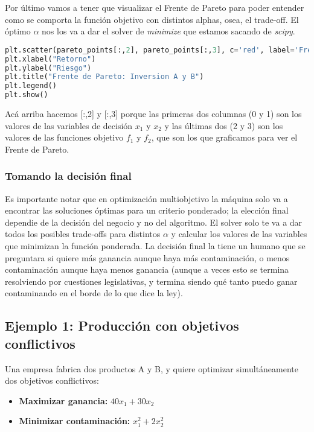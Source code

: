\documentclass[12pt]{article}
\begin{document}
Por último vamos a tener que visualizar el Frente de Pareto para poder entender como se comporta la función objetivo con distintos alphas, osea, el trade-off. El óptimo $\alpha$ nos los va a dar el solver de \textit{minimize} que estamos sacando de \textit{scipy}.

\begin{lstlisting}[language=Python]
plt.scatter(pareto_points[:,2], pareto_points[:,3], c='red', label='Frente de Pareto')
plt.xlabel("Retorno")
plt.ylabel("Riesgo")
plt.title("Frente de Pareto: Inversion A y B")
plt.legend()
plt.show()
\end{lstlisting}

Acá arriba hacemos [:,2] y [:,3] porque las primeras dos columnas (0 y 1) son los valores de las variables de decisión $x_1$ y $x_2$ y las últimas dos (2 y 3) son los valores de las funciones objetivo $f_1$ y $f_2$, que son los que graficamos para ver el Frente de Pareto.

\subsubsection{Tomando la decisión final}

Es importante notar que en optimización multiobjetivo la máquina solo va a encontrar las soluciones óptimas para un criterio ponderado; la elección final dependie de la decisión del negocio y no del algoritmo. El solver solo te va a dar todos los posibles trade-offs para distintos $\alpha$ y calcular los valores de las variables que minimizan la función ponderada. La decisión final la tiene un humano que se preguntara si quiere más ganancia aunque haya más contaminación, o menos contaminación aunque haya menos ganancia (aunque a veces esto se termina resolviendo por cuestiones legislativas, y termina siendo qué tanto puedo ganar contaminando en el borde de lo que dice la ley).

\subsection{Ejemplo 1: Producción con objetivos conflictivos}

Una empresa fabrica dos productos A y B, y quiere optimizar simultáneamente dos objetivos conflictivos:

\begin{itemize}
    \item \textbf{Maximizar ganancia:} $40x_1 + 30x_2$
    \item \textbf{Minimizar contaminación:} $x_1^2 + 2x_2^2$
\end{itemize}
\end{document}
